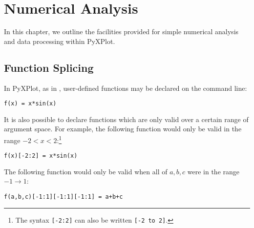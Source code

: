 %
%
%
%
%



\chapter{Numerical Analysis}

In this chapter, we outline the facilities provided for simple numerical
analysis and data processing within PyXPlot.

\section{Function Splicing}

In PyXPlot, as in \gnuplot, user-defined functions may be declared on the
command line:

\begin{verbatim}
f(x) = x*sin(x)
\end{verbatim}

\noindent It is also possible to declare functions which are only valid over a
certain range of argument space. For example, the following function would only
be valid in the range $-2<x<2$:\footnote{The syntax {\tt [-2:2]} can also be
written {\tt [-2 to 2]}.}

\begin{verbatim}
f(x)[-2:2] = x*sin(x)
\end{verbatim}

\noindent The following function would only be valid when all of ${a,b,c}$ were
in the range $-1 \to 1$:

\begin{verbatim}
f(a,b,c)[-1:1][-1:1][-1:1] = a+b+c
\end{verbatim}

